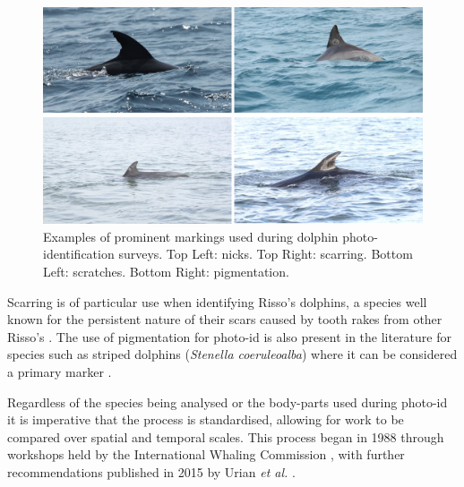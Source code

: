 \begin{figure}
	\begin{center}
		\includegraphics[scale=0.6]{Chapter2/figs/nicks-scarring-scratching-pigmentation.png}
	\end{center}
	\caption[Examples of prominent markings used during dolphin photo-identification surveys.]{Examples of prominent markings used during dolphin photo-identification surveys. Top Left: nicks. Top Right: scarring. Bottom Left: scratches. Bottom Right: pigmentation.
	}
	\label{fig:nicks-scarring-scratching-pigmentation}
\end{figure}

Scarring is of particular use when identifying Risso's dolphins, a species well known for the persistent nature of their scars caused by tooth rakes from other Risso's \cite{mariani_analysis_2016}. The use of pigmentation for photo-id is also present in the literature for species such as striped dolphins (\textit{Stenella coeruleoalba}) where it can be considered a primary marker \cite{rosso_colour_2008}.

Regardless of the species being analysed or the body-parts used during photo-id it is imperative that the process is standardised, allowing for work to be compared over spatial and temporal scales. This process began in 1988 through workshops held by the International Whaling Commission \cite{hammond_individual_1990}, with further recommendations published in 2015 by Urian \textit{et al.} \cite{urian_recommendations_2015}.

